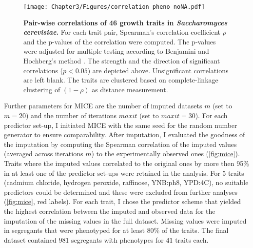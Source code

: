 \begin{figure}[hbtp]
	\centering
	\texttt{[image: Chapter3/Figures/correlation\_pheno\_noNA.pdf]}
	\caption[\textbf{Pairwise correlations of \num{46} growth traits in \emph{Saccharomyces cerevisiae}.} Generated via R function \textit{corrplot::corrplot}]{\textbf{Pair-wise correlations of \num{46} growth traits in \emph{Saccharomyces cerevisiae}.} For each trait pair, Spearman's correlation coefficient \(\rho\) and the p-values of the correlation were computed. The p-values were adjusted for multiple testing according to Benjamini and Hochberg's method \citep{Benjamini1995}. The strength and the direction of significant correlations (\(p < 0.05\)) are depicted above. Unsignificant correlations are left blank. The traits are clustered based on complete-linkage clustering of \((1-\rho)\) as distance measurement.}
 	\label{fig:traitcorrelations}
\end{figure}


Further parameters for MICE are the number of imputed datasets \(m\) (set to \(m=20\)) and the number of iterations \(maxit\) (set to \(maxit=30\)). For each predictor set-up, I initiated MICE with the same seed for the random number generator to ensure comparability. After imputation, I evaluated the goodness of the imputation  by computing the Spearman correlation of the imputed values (averaged across iterations \(m\)) to the experimentally observed ones (\cref{fig:mice}). Traits where the imputed values correlated to the original ones by more then \num{95}\% in at least one of the predictor set-ups were retained in the analysis. For \num{5} traits (cadmium chloride, hydrogen peroxide, raffinose, YNB:ph8, YPD:4C), no suitable predictors could be determined and these were excluded from further analyses (\cref{fig:mice}, red labels). For each trait, I chose the predictor scheme that yielded the highest correlation between the imputed and observed data for the imputation of the missing values in the full dataset. Missing values were imputed in segregants that were phenotyped for at least \num{80}\% of the traits. The final dataset contained \num{981} segregants with phenotypes for \num{41} traits each. 
 	
